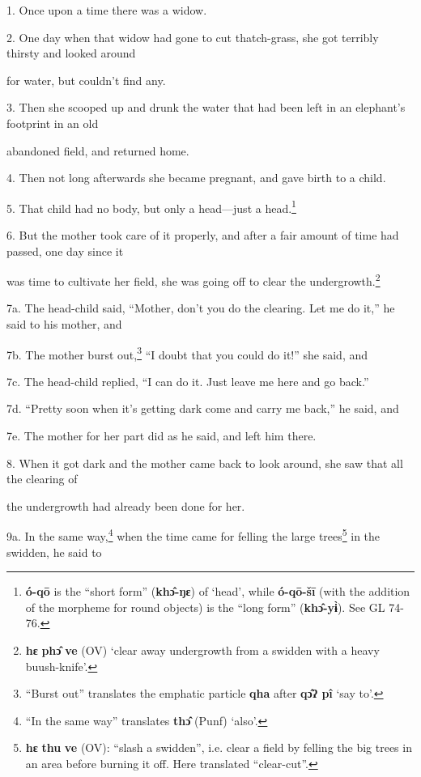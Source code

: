 \setcounter{footnote}{0}

1. Once upon a time there was a widow.

2. One day when that widow had gone to cut thatch-grass, she got terribly thirsty
and looked around

for water, but couldn't find any.

3. Then she scooped up and drunk the water that had been left in an elephant's
footprint in an old

abandoned field, and returned home.

4. Then not long afterwards she became pregnant, and gave birth to a child.

5. That child had no body, but only a head---just a head.\footnote{\textbf{ó-qō} is the ``short form'' (\textbf{khɔ̂-ŋɛ}) of `head', while \textbf{ó-qō-šī} (with the addition of the morpheme for round objects) is the ``long form'' (\textbf{khɔ̂-yɨ̀}). See GL 74-76.}

6. But the mother took care of it properly, and after a fair amount of time had
passed, one day since it

was time to cultivate her field, she was going off to clear the undergrowth.\footnote{\textbf{hɛ} \textbf{phɔ̂} \textbf{ve} (OV) `clear away undergrowth from a swidden with a heavy buush-knife'.}

7a. The head-child said, ``Mother, don't you do the clearing. Let me do it,'' he
said to his mother, and

7b. The mother burst out,\footnote{``Burst out'' translates the emphatic particle \textbf{qha} after \textbf{qɔ̂ʔ pî} `say to'.} ``I doubt that you could do it!'' she said, and

7c. The head-child replied, ``I can do it. Just leave me here and go back.''

7d. ``Pretty soon when it's getting dark come and carry me back,'' he said, and

7e. The mother for her part did as he said, and left him there.

8. When it got dark and the mother came back to look around, she saw that all the
clearing of

the undergrowth had already been done for her.

9a. In the same way,\footnote{``In the same way'' translates \textbf{thɔ̂} (Punf) `also'.} when the time came for felling the large trees\footnote{\textbf{hɛ} \textbf{thu} \textbf{ve} (OV): ``slash a swidden'', i.e. clear a field by felling the big trees in an area before burning it off. Here translated ``clear-cut''.} in
the swidden, he said to

